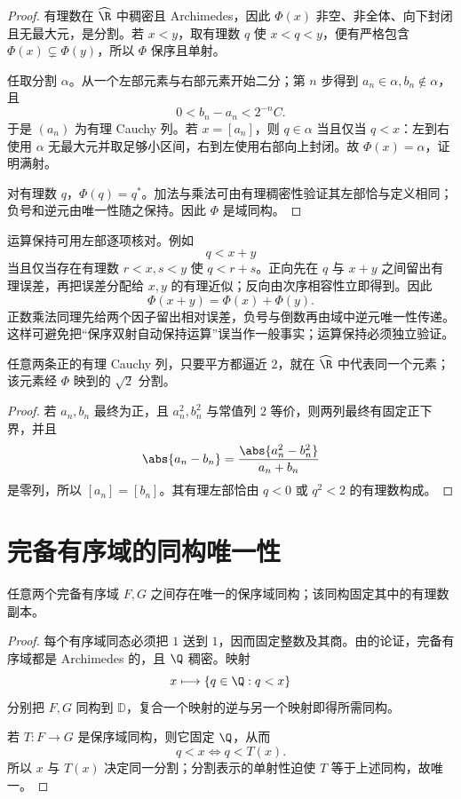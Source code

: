 \begin{proof}
有理数在 \(\widehat{\R}\) 中稠密且 Archimedes，因此 \(\Phi(x)\) 非空、非全体、向下封闭且无最大元，是分割。若 \(x<y\)，取有理数 \(q\) 使 \(x<q<y\)，便有严格包含 \(\Phi(x)\subsetneq\Phi(y)\)，所以 \(\Phi\) 保序且单射。

任取分割 \(\alpha\)。从一个左部元素与右部元素开始二分；第 \(n\) 步得到 \(a_n\in\alpha,b_n\notin\alpha\)，且
\[
 0<b_n-a_n<2^{-n}C.
\]
于是 \((a_n)\) 为有理 Cauchy 列。若 \(x=[a_n]\)，则 \(q\in\alpha\) 当且仅当 \(q<x\)：左到右使用 \(\alpha\) 无最大元并取足够小区间，右到左使用右部向上封闭。故 \(\Phi(x)=\alpha\)，证明满射。

对有理数 \(q\)，\(\Phi(q)=q^*\)。加法与乘法可由有理稠密性验证其左部恰与定义相同；负号和逆元由唯一性随之保持。因此 \(\Phi\) 是域同构。
\end{proof}

运算保持可用左部逐项核对。例如
\[
 q<x+y
\]
当且仅当存在有理数 \(r<x,s<y\) 使 \(q<r+s\)。正向先在 \(q\) 与 \(x+y\) 之间留出有理误差，再把误差分配给 \(x,y\) 的有理近似；反向由次序相容性立即得到。因此
\[
 \Phi(x+y)=\Phi(x)+\Phi(y).
\]
正数乘法同理先给两个因子留出相对误差，负号与倒数再由域中逆元唯一性传递。这样可避免把“保序双射自动保持运算”误当作一般事实；运算保持必须独立验证。

\begin{corollary}
任意两条正的有理 Cauchy 列，只要平方都逼近 \(2\)，就在 \(\widehat{\R}\) 中代表同一个元素；该元素经 \(\Phi\) 映到的 \(\sqrt2\) 分割。
\end{corollary}

\begin{proof}
若 \(a_n,b_n\) 最终为正，且 \(a_n^2,b_n^2\) 与常值列 \(2\) 等价，则两列最终有固定正下界，并且
\[
 \abs{a_n-b_n}
 =\frac{\abs{a_n^2-b_n^2}}{a_n+b_n}
\]
是零列，所以 \([a_n]=[b_n]\)。其有理左部恰由 \(q<0\) 或 \(q^2<2\) 的有理数构成。
\end{proof}

\section{完备有序域的同构唯一性}

\begin{theorem}
任意两个完备有序域 \(F,G\) 之间存在唯一的保序域同构；该同构固定其中的有理数副本。
\end{theorem}

\begin{proof}
每个有序域同态必须把 \(1\) 送到 \(1\)，因而固定整数及其商。由的论证，完备有序域都是 Archimedes 的，且 \(\Q\) 稠密。映射
\[
 x\longmapsto\{q\in\Q:q<x\}
\]
分别把 \(F,G\) 同构到 \(\mathbb D\)，复合一个映射的逆与另一个映射即得所需同构。

若 \(T:F\to G\) 是保序域同构，则它固定 \(\Q\)，从而
\[
 q<x\Longleftrightarrow q<T(x).
\]
所以 \(x\) 与 \(T(x)\) 决定同一分割；分割表示的单射性迫使 \(T\) 等于上述同构，故唯一。
\end{proof}

